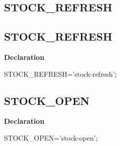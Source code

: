 \documentclass{report}
\newif\ifpdf
\begin{document}
\subsection*{\large{\textbf{STOCK{\_}REFRESH}}\normalsize\hspace{1ex}\hrulefill}
\else
\subsection*{STOCK{\_}REFRESH}
\fi
\label{licommon-STOCK_REFRESH}
\begin{list}{}{
\setlength{\itemindent}{0cm}
\setlength{\listparindent}{0cm}
\setlength{\leftmargin}{\evensidemargin}
\addtolength{\leftmargin}{\tmplength}
\settowidth{\labelsep}{X}
\addtolength{\leftmargin}{\labelsep}
\setlength{\labelwidth}{\tmplength}
}
\item[\textbf{Declaration}\hfill]
\ifpdf
\begin{flushleft}
\fi
\begin{ttfamily}
STOCK{\_}REFRESH='stock-refresh';\end{ttfamily}

\ifpdf
\end{flushleft}
\fi

\end{list}
\ifpdf
\subsection*{\large{\textbf{STOCK{\_}OPEN}}\normalsize\hspace{1ex}\hrulefill}
\else
\subsection*{STOCK{\_}OPEN}
\fi
\label{licommon-STOCK_OPEN}
\begin{list}{}{
\setlength{\itemindent}{0cm}
\setlength{\listparindent}{0cm}
\setlength{\leftmargin}{\evensidemargin}
\addtolength{\leftmargin}{\tmplength}
\settowidth{\labelsep}{X}
\addtolength{\leftmargin}{\labelsep}
\setlength{\labelwidth}{\tmplength}
}
\item[\textbf{Declaration}\hfill]
\ifpdf
\begin{flushleft}
\fi
\begin{ttfamily}
STOCK{\_}OPEN='stock-open';\end{ttfamily}

\ifpdf
\end{flushleft}
\fi

\end{list}
\ifpdf
\end{document}
